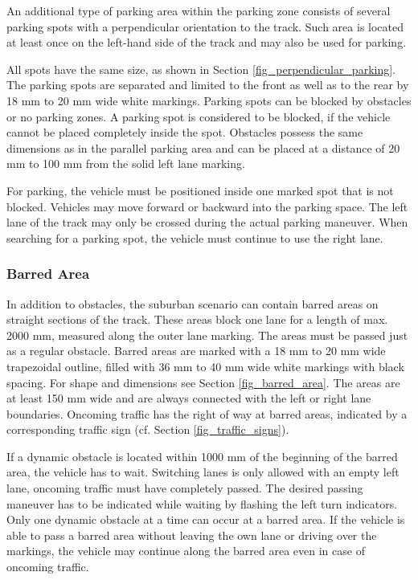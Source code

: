 \begin{highlight}
	An additional type of parking area within the parking zone consists of several
	parking spots with a perpendicular orientation to the track. Such area is
	located at least once on the left-hand side of the track and may also be used
	for parking.

	All spots have the same size, as shown in Section
	\ref{fig_perpendicular_parking}. The parking spots are separated and limited to
	the front as well as to the rear by 18 mm to 20 mm wide white markings. Parking
	spots can be blocked by obstacles or no parking zones. A parking spot is
	considered to be blocked, if the vehicle cannot be placed completely inside the
	spot. Obstacles possess the same dimensions as in the parallel parking area and
	can be placed at a distance of 20 mm to 100 mm from the solid left lane
	marking.

	For parking, the vehicle must be positioned inside one marked spot that is not
	blocked. Vehicles may move forward or backward into the parking space. The left
	lane of the track may only be crossed during the actual parking maneuver. When
	searching for a parking spot, the vehicle must continue to use the right lane.
\end{highlight}

\subsubsection{Barred Area}

In addition to obstacles, the suburban scenario can contain barred areas on
straight sections of the track. These areas block one lane for a length of max.
2000 mm, measured along the outer lane marking. The areas must be passed just
as a regular obstacle. Barred areas are marked with a 18 mm to 20 mm wide
trapezoidal outline, filled with 36 mm to 40 mm wide white markings with black
spacing. For shape and dimensions see Section \ref{fig_barred_area}. The areas
are at least 150 mm wide and are always connected with the left or right lane
boundaries. Oncoming traffic has the right of way at barred areas, indicated by
a corresponding traffic sign (cf. Section \ref{fig_traffic_signs}).

If a dynamic obstacle is located within 1000 mm of the beginning of the barred
area, the vehicle has to wait. Switching lanes is only allowed with an empty
left lane, oncoming traffic must have completely passed. The desired passing
maneuver has to be indicated while waiting by flashing the left turn
indicators. Only one dynamic obstacle at a time can occur at a barred area. If
the vehicle is able to pass a barred area without leaving the own lane or
driving over the markings, the vehicle may continue along the barred area even
in case of oncoming traffic.

